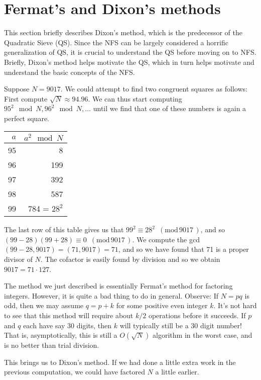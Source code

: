 \documentclass[12pt]{article}
\newcommand{\md}[1]{\,\,\, ( \mathrm{mod}\, #1 \,) }
\begin{document}
  

\section{Fermat's and Dixon's methods} \label{sec:dixon}

  This section briefly describes Dixon's method, which is the
  predecessor of the Quadratic Sieve (QS). Since
  the NFS can be largely considered a horrific generalization
  of QS, it is crucial to understand the QS before moving on
  to NFS. Briefly, Dixon's method helps motivate the QS, which
  in turn helps motivate and understand the basic concepts of the
  NFS.

  Suppose $N=9017$. We could attempt to find two congruent squares
  as follows: First compute $\sqrt{N}\approx 94.96$. We can
  thus start computing $95^2 \mod N, 96^2 \mod N,\ldots$ until
  we find that one of these numbers is again a perfect square.
  \begin{center}\begin{tabular}{|r|r|}
    \hline
    $a$ & $a^2\mod N$ \\
    \hline
    95 & 8 \\
    96 & 199 \\
    97 & 392 \\
    98 & 587 \\
    99 & 784 = $28^2$\\
    \hline
  \end{tabular}\end{center}
  The last row of this table gives us that $99^2\equiv 28^2\md{9017}$,
  and so $(99-28)(99+28)\equiv 0 \md{9017}$. We compute the gcd
  $(99-28, 9017) = (71, 9017) = 71$, and so we have found that 71 is
  a proper divisor of $N$. The cofactor is easily found by division
  and so we obtain $9017 = 71\cdot 127$.
  
  The method we just described is essentially Fermat's method for
  factoring integers. However, it is quite a bad thing to do in general.
  Observe: If $N=pq$ is odd, then we may assume $q=p+k$ for some positive
  even integer $k$. It's not hard to see that this method will require
  about $k/2$ operations before it succeeds. If $p$ and $q$ each have
  say 30 digits, then $k$ will typically still be a 30 digit number!
  That is, asymptotically, this is still a $O(\sqrt{N})$ algorithm
  in the worst case, and is no better than trial division.

  This brings us to Dixon's method. If we had done a little extra work in
  the previous computation, we could have factored $N$ a little earlier.
\end{document}
